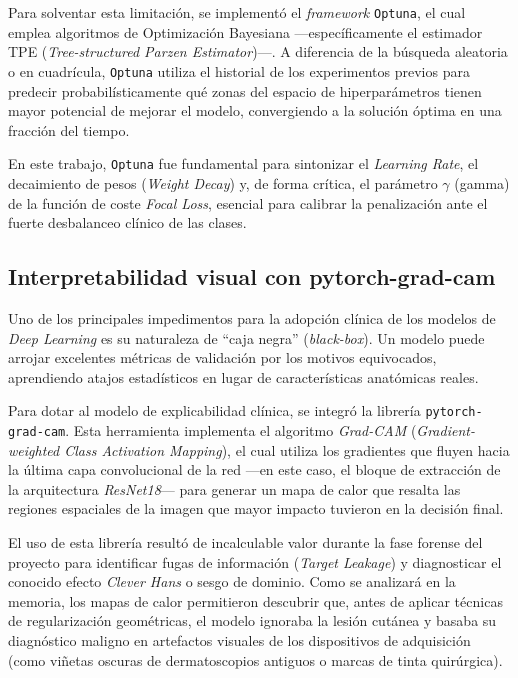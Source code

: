 Para solventar esta limitación, se implementó el \textit{framework} \texttt{Optuna}, el cual emplea algoritmos de Optimización Bayesiana ---específicamente el estimador TPE (\textit{Tree-structured Parzen Estimator})---. A diferencia de la búsqueda aleatoria o en cuadrícula, \texttt{Optuna} utiliza el historial de los experimentos previos para predecir probabilísticamente qué zonas del espacio de hiperparámetros tienen mayor potencial de mejorar el modelo, convergiendo a la solución óptima en una fracción del tiempo. 

En este trabajo, \texttt{Optuna} fue fundamental para sintonizar el \textit{Learning Rate}, el decaimiento de pesos (\textit{Weight Decay}) y, de forma crítica, el parámetro $\gamma$ (gamma) de la función de coste \textit{Focal Loss}, esencial para calibrar la penalización ante el fuerte desbalanceo clínico de las clases.

\subsection{Interpretabilidad visual con pytorch-grad-cam}

Uno de los principales impedimentos para la adopción clínica de los modelos de \textit{Deep Learning} es su naturaleza de ``caja negra'' (\textit{black-box}). Un modelo puede arrojar excelentes métricas de validación por los motivos equivocados, aprendiendo atajos estadísticos en lugar de características anatómicas reales.

Para dotar al modelo de explicabilidad clínica, se integró la librería \texttt{pytorch-grad-cam}. Esta herramienta implementa el algoritmo \textit{Grad-CAM} (\textit{Gradient-weighted Class Activation Mapping}), el cual utiliza los gradientes que fluyen hacia la última capa convolucional de la red ---en este caso, el bloque de extracción de la arquitectura \textit{ResNet18}--- para generar un mapa de calor que resalta las regiones espaciales de la imagen que mayor impacto tuvieron en la decisión final.

El uso de esta librería resultó de incalculable valor durante la fase forense del proyecto para identificar fugas de información (\textit{Target Leakage}) y diagnosticar el conocido efecto \textit{Clever Hans} o sesgo de dominio. Como se analizará en la memoria, los mapas de calor permitieron descubrir que, antes de aplicar técnicas de regularización geométricas, el modelo ignoraba la lesión cutánea y basaba su diagnóstico maligno en artefactos visuales de los dispositivos de adquisición (como viñetas oscuras de dermatoscopios antiguos o marcas de tinta quirúrgica).

